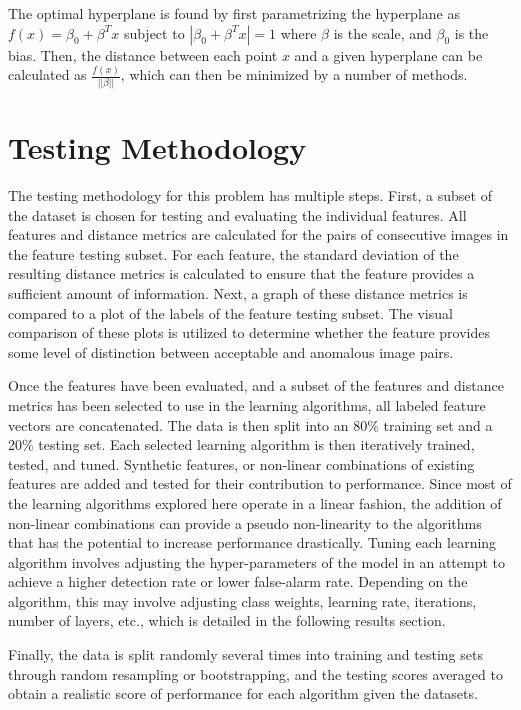 The optimal hyperplane is found by first parametrizing the hyperplane as $f(x) = \beta_0 + \beta^Tx$ subject to $|\beta_0 + \beta^Tx| =1$ where $\beta$ is the scale, and $\beta_0$ is the bias.
Then, the distance between each point $x$ and a given hyperplane can be calculated as $\frac{f(x)}{||\beta||}$, which can then be minimized by a number of methods.



\section{Testing Methodology}

The testing methodology for this problem has multiple steps.
First, a subset of the dataset is chosen for testing and evaluating the individual features.
All features and distance metrics are calculated for the pairs of consecutive images in the feature testing subset.
For each feature, the standard deviation of the resulting distance metrics is calculated to ensure that the feature provides a sufficient amount of information.
Next, a graph of these distance metrics is compared to a plot of the labels of the feature testing subset.
The visual comparison of these plots is utilized to determine whether the feature provides some level of distinction between acceptable and anomalous image pairs.

Once the features have been evaluated, and a subset of the features and distance metrics has been selected to use in the learning algorithms, all labeled feature vectors are concatenated.
The data is then split into an 80\% training set and a 20\% testing set.
Each selected learning algorithm is then iteratively trained, tested, and tuned.
Synthetic features, or non-linear combinations of existing features are added and tested for their contribution to performance.
Since most of the learning algorithms explored here operate in a linear fashion, the addition of non-linear combinations can provide a pseudo non-linearity to the algorithms that has the potential to increase performance drastically.
Tuning each learning algorithm involves adjusting the hyper-parameters of the model in an attempt to achieve a higher detection rate or lower false-alarm rate.
Depending on the algorithm, this may involve adjusting class weights, learning rate, iterations, number of layers, etc., which is detailed in the following results section.

Finally, the data is split randomly several times into training and testing sets through random resampling or bootstrapping, and the testing scores averaged to obtain a realistic score of performance for each algorithm given the datasets.

